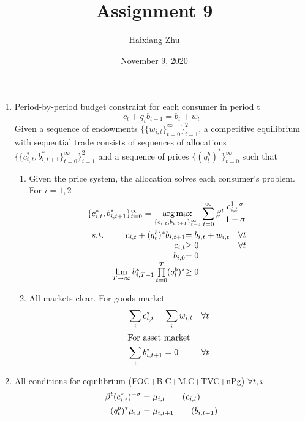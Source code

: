 \documentclass{article}
\title{Assignment 9}
\date{November 9, 2020}
\author{Haixiang Zhu}
\DeclareMathOperator*{\argmax}{arg\,max}
\begin{document}
    \maketitle
    \renewcommand{\arraystretch}{1.5}
    \begin{enumerate}
        \item Period-by-period budget constraint for each consumer in period t
        \[c_t+q_tb_{t+1}=b_t+w_t\]
        Given a sequence of endowments $\{\{w_{i,t}\}_{t=0}^\infty\}_{i=1}^2$, a competitive equilibrium with sequential trade consists of sequences of allocations $\{\{c_{i,t}^\ast,b_{i,t+1}^\ast\}_{t=0}^\infty\}_{i=1}^2$ and a sequence of prices $\{(q_{t}^b)^\ast\}_{t=0}^\infty$ such that
        \begin{enumerate}
            \item Given the price system, the allocation solves each consumer's problem. For $i=1,2$
            \begin{align*}
                &\{c_{i,t}^\ast,b_{i,t+1}^\ast\}_{t=0}^\infty=\argmax_{\{c_{i,t},b_{i,t+1}\}_{t=0}^\infty}\sum_{t=0}^\infty\beta^t\frac{c_{i,t}^{1-\sigma}}{1-\sigma}\\
                &\begin{array}{r@{\quad}r@{}l@{\quad}l}
                s.t.&c_{i,t}+(q_{t}^b)^\ast b_{i,t+1}&= b_{i,t}+w_{i,t}&\forall t\\
                &c_{i,t}&\ge0 &\forall t\\
                &b_{i,0}&=0\\
                &\lim\limits_{T\to\infty}b_{i,T+1}^\ast\prod\limits_{t=0}^T(q_{t}^b)^\ast&\ge0
                \end{array} 
            \end{align*}
            \item All markets clear. For goods market 
            \begin{align*}
                &\sum_i c_{i,t}^\ast=\sum_i w_{i,t}&\forall t\\
                \intertext{For asset market}
                &\sum_i b_{i,t+1}^\ast=0&\forall t
            \end{align*}
        \end{enumerate}
        \item All conditions for equilibrium (FOC+B.C+M.C+TVC+nPg) $\forall t,i$
        \begin{align}
            \beta^t(c_{i,t}^\ast)^{-\sigma}&=\mu_{i,t}\tag{$c_{i,t}$}\\
            (q_{t}^b)^\ast\mu_{i,t}&=\mu_{i,t+1}\tag{$b_{i,t+1}$}\\

\end{align}
\end{enumerate}
\end{document}

